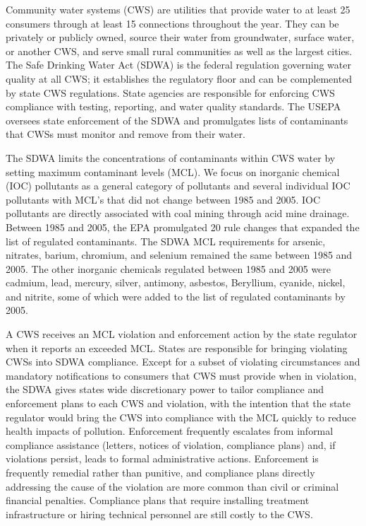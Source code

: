 \documentclass{article}
\begin{document}
Community water systems (CWS) are utilities that provide water to at least 25 consumers through at least 15 connections throughout the year. They can be privately or publicly owned, source their water from groundwater, surface water, or another CWS, and serve small rural communities as well as the largest cities. The Safe Drinking Water Act (SDWA) is the federal regulation governing water quality at all CWS; it establishes the regulatory floor and can be complemented by state CWS regulations. State agencies are responsible for enforcing CWS compliance with testing, reporting, and water quality standards. The USEPA oversees state enforcement of the SDWA and promulgates lists of contaminants that CWSs must monitor and remove from their water. 

The SDWA limits the concentrations of contaminants within CWS water by setting maximum contaminant levels (MCL). We focus on inorganic chemical (IOC) pollutants as a general category of pollutants and several individual IOC pollutants with MCL's that did not change between 1985 and 2005. IOC pollutants are directly associated with coal mining through acid mine drainage. Between 1985 and 2005, the EPA promulgated 20 rule changes that expanded the list of regulated contaminants. The SDWA MCL requirements for arsenic, nitrates, barium, chromium, and selenium remained the same between 1985 and 2005. The other inorganic chemicals regulated between 1985 and 2005 were cadmium, lead, mercury, silver, antimony, asbestos, Beryllium, cyanide, nickel, and nitrite, some of which were added to the list of regulated contaminants by 2005. 

A CWS receives an MCL violation and enforcement action by the state regulator when it reports an exceeded MCL. States are responsible for bringing violating CWSs into SDWA compliance. Except for a subset of violating circumstances and mandatory notifications to consumers that CWS must provide when in violation, the SDWA gives states wide discretionary power to tailor compliance and enforcement plans to each CWS and violation, with the intention that the state regulator would bring the CWS into compliance with the MCL quickly to reduce health impacts of pollution. Enforcement frequently escalates from informal compliance assistance (letters, notices of violation, compliance plans) and, if violations persist, leads to formal administrative actions. Enforcement is frequently remedial rather than punitive, and compliance plans directly addressing the cause of the violation are more common than civil or criminal financial penalties. Compliance plans that require installing treatment infrastructure or hiring technical personnel are still costly to the CWS. 
\end{document}
